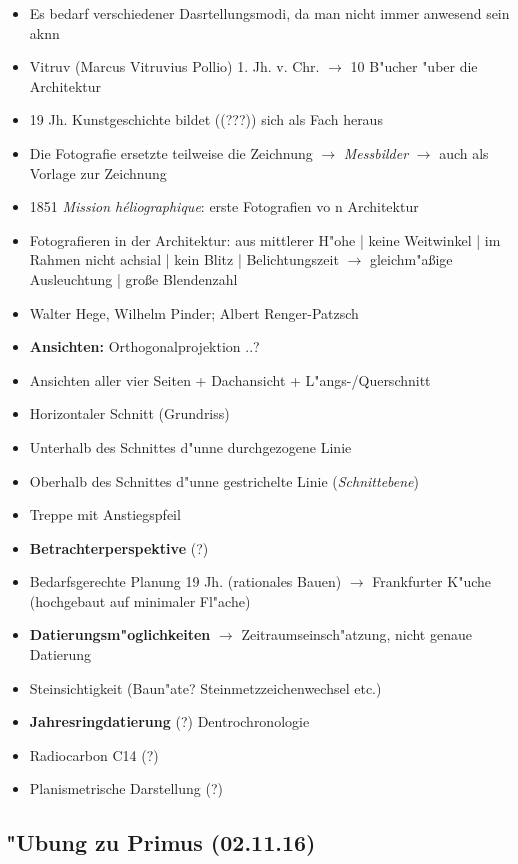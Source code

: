 \documentclass[]{scrartcl}
\begin{document}
\begin{itemize}
  \item Es bedarf verschiedener Dasrtellungsmodi, da man nicht immer anwesend sein aknn
  \item Vitruv (Marcus Vitruvius Pollio) 1. Jh. v. Chr. $\rightarrow$ 10 B"ucher "uber die Architektur
  \item 19 Jh. Kunstgeschichte bildet ({\color{red}(???)}) sich als Fach heraus
  \item Die Fotografie ersetzte teilweise die Zeichnung $\rightarrow$ \emph{Messbilder} $\rightarrow$ auch als Vorlage zur Zeichnung
  \item 1851 \emph{Mission h\'{e}liographique}: erste Fotografien vo n Architektur
  \item Fotografieren in der Architektur: aus mittlerer H"ohe | keine Weitwinkel | im Rahmen nicht achsial | kein Blitz | Belichtungszeit $\rightarrow$ gleichm"a\ss ige Ausleuchtung | gro\ss e Blendenzahl
  \item Walter Hege, Wilhelm Pinder; Albert Renger-Patzsch
  \item \textbf{Ansichten:} {\color{red}Orthogonalprojektion ..?} 
  \item Ansichten aller vier Seiten + Dachansicht + L"angs-/Querschnitt
  \item Horizontaler Schnitt (Grundriss)
  \item Unterhalb des Schnittes d"unne durchgezogene Linie
  \item Oberhalb des Schnittes d"unne gestrichelte Linie (\emph{Schnittebene})
  \item Treppe mit Anstiegspfeil
  \item \textbf{Betrachterperspektive} {\color{red}(?)} 
  \item Bedarfsgerechte Planung 19 Jh. (rationales Bauen) $\rightarrow$ Frankfurter K"uche (hochgebaut auf minimaler Fl"ache)
  \item \textbf{Datierungsm"oglichkeiten} $\rightarrow$ Zeitraumseinsch"atzung, nicht genaue Datierung
  \item Steinsichtigkeit (Baun"ate? Steinmetzzeichenwechsel etc.) 
  \item \textbf{Jahresringdatierung} {\color{red}(?)} Dentrochronologie
  \item Radiocarbon C14 {\color{red}(?)}
  \item Planismetrische Darstellung {\color{red}(?)}
\end{itemize}


\subsection{"Ubung zu Primus (02.11.16)}
\end{document}
